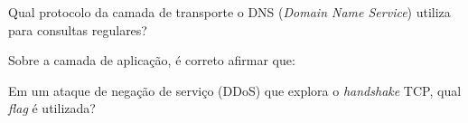 \documentclass[10pt,a4paper]{article}
\begin{document}
%
{
\def\AMCbeginQuestion#1#2{\par\noindent{\bf (POSCOMP 2024 - Questão 67)}}
\begin{question}{} Qual protocolo da camada de transporte o DNS (\textit{Domain Name Service}) utiliza para consultas regulares?
\begin{choices}
\end{choices}
\end{question}
}
%
{
\def\AMCbeginQuestion#1#2{\par\noindent{\bf (POSCOMP 2025 - Questão 65)}}
\begin{question}{} Sobre a camada de aplicação, é correto afirmar que:
\begin{choices}
\end{choices}
\end{question}
}
%
{
\def\AMCbeginQuestion#1#2{\par\noindent{\bf (POSCOMP 2025 - Questão 67)}}
\begin{question}{} Em um ataque de negação de serviço (DDoS) que explora o \textit{handshake} TCP, qual \textit{flag} é utilizada?
\begin{choices}
\end{choices}
\end{question}
}
%
\end{document}
